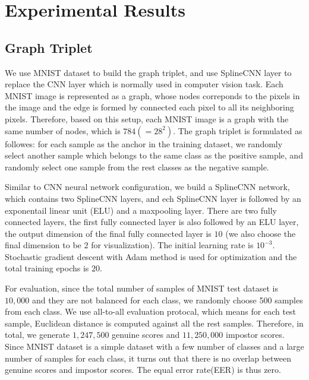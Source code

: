 \section{Experimental Results}
\label{sec:experiment}



\subsection{Graph Triplet}
We use MNIST dataset \cite{LecunIEEE1998} to build the graph triplet, and use SplineCNN layer \cite{FeyCVPR2018splinecnn} \cite{FeyICLR2020DGMC} to replace the CNN layer which is normally used in computer vision task. Each MNIST image is represented as a graph, whose nodes correponds to the pixels in the image and the edge is formed by connected each pixel to all its neighboring pixels. Therefore, based on this setup, each MNIST image is a graph with the same number of nodes, which is $784(=28^2)$. The graph triplet is formulated as followes: for each sample as the anchor in the training dataset, we randomly select another sample which belongs to the same class as the positive sample, and randomly select one sample from the rest classes as the negative sample. 

Similar to CNN neural network configuration, we build a SplineCNN network, which contains two SplineCNN layers, and ech SplineCNN layer is followed by an exponentail linear unit (ELU) and a maxpooling layer. There are two fully connected layers, the first fully connected layer is also followed by an ELU layer, the output dimension of the final fully connected layer is $10$ (we also choose the final dimension to be $2$ for visualization). The initial learning rate is $10^{-3}$. Stochastic gradient descent with Adam method is used for optimization and the total training epochs is $20$.

For evaluation, since the total number of samples of MNIST test dataset is $10,000$ and they are not balanced for each class, we randomly choose 500 samples from each class. We use all-to-all evaluation protocal, which means for each test sample, Euclidean distance is computed against all the rest samples. Therefore, in total, we generate $1,247,500$ genuine scores and $11,250,000$ impostor scores. Since MNIST dataset is a simple dataset with a few number of classes and a large number of samples for each class, it turns out that there is no overlap between genuine scores and impostor scores. The equal error rate(EER) is thus zero.